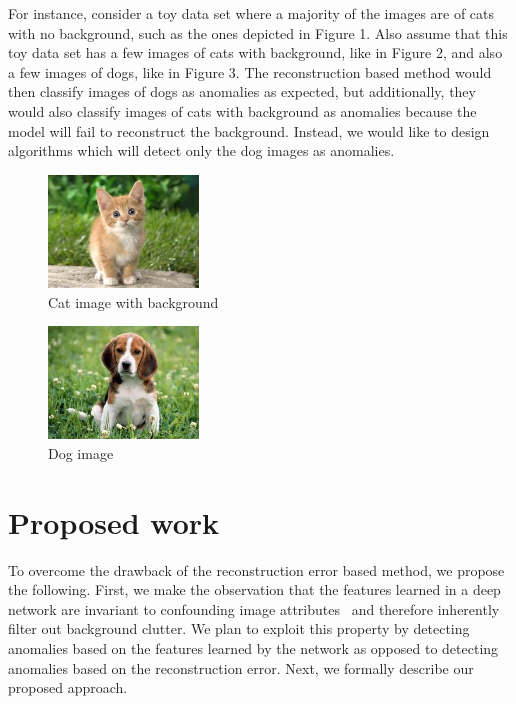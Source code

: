 \documentclass[10pt,twocolumn,letterpaper]{article}
\begin{document}
For instance, consider a toy data set where a majority of the images are of cats with no background, such as the ones depicted in Figure 1. Also assume that this toy data set has a few images of cats with background, like in Figure 2, and also a few images of dogs, like in Figure 3. The reconstruction based method would then classify images of dogs as anomalies as expected, but additionally, they would also classify images of cats with background as anomalies because the model will fail to reconstruct the background. Instead, we would like to design algorithms which will detect only the dog images as anomalies.

\begin{figure}[ht!]
\centering
\includegraphics[width=40mm]{figs/cat_background.jpeg}
\caption{Cat image with background\label{overflow}}
\end{figure}

\begin{figure}[ht!]
\centering
\includegraphics[width=40mm]{figs/dog.jpeg}
\caption{Dog image\label{overflow}}
\end{figure}

\section{Proposed work}

To overcome the drawback of the reconstruction error based method, we propose the following. First, we make the observation that the features learned in a deep network are invariant to confounding image attributes~\cite{invariance} and therefore inherently filter out background clutter. We plan to exploit this property by detecting anomalies based on the features learned by the network as opposed to detecting anomalies based on the reconstruction error. Next, we formally describe our proposed approach.
\end{document}
